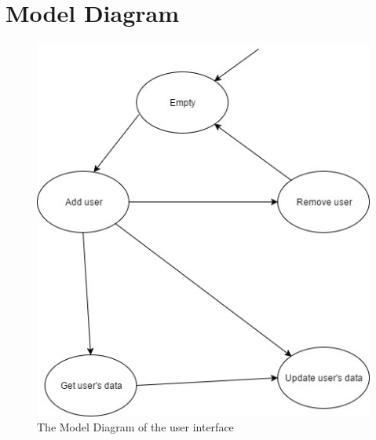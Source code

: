 \section{Model Diagram}
\begin{figure}
  \includegraphics[width=\linewidth]{re.jpg}
  \caption{The Model Diagram of the user interface}
  \label{fig:model}
\end{figure}

